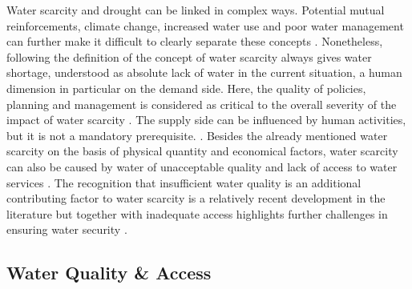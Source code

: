 Water scarcity and drought can be linked in complex ways. Potential mutual reinforcements, climate change, increased water use and poor water management can further make it difficult to clearly separate these concepts \autocite{idmpDroughtWaterScarcity2022,lealfilhoUnderstandingResponsesClimaterelated2022,liuWaterScarcityAssessments2017,rcrcFORECASTBASEDFINANCINGEARLY2020}. Nonetheless, following the definition of \autocite{faoCopingWaterScarcity2012} the concept of water scarcity always gives water shortage, understood as absolute lack of water in the current situation, a human dimension in particular on the demand side. Here, the quality of policies, planning and management is considered as critical to the overall severity of the impact of water scarcity \autocite{idmpDroughtWaterScarcity2022,faoCopingWaterScarcity2012,vereintenationenSpecialReportDrought2021}. The supply side can be influenced by human activities, but it is not a mandatory prerequisite. \autocite{idmpDroughtWaterScarcity2022}.\newline
Besides the already mentioned water scarcity on the basis of physical quantity and economical factors, water scarcity can also be caused by water of unacceptable quality and lack of access to water services \autocite{faoCopingWaterScarcity2012}. The recognition that insufficient water quality is an additional contributing factor to water scarcity is a relatively recent development in the literature \autocite{liuThreedimensionalWaterScarcity2020} but together with inadequate access highlights further challenges in ensuring water security \autocite{caretta2022water, mishraWaterSecurityChanging2021}. 


\subsection{Water Quality \& Access}\label{subsec:water_quality}

